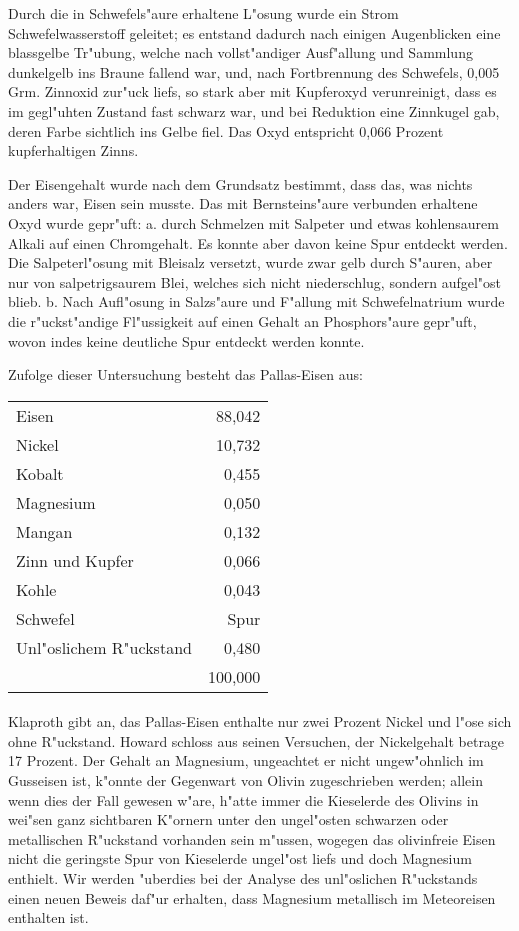 \documentclass[a4paper, 11pt, oneside]{article}
\begin{document}
Durch die in Schwefels"aure erhaltene L"osung wurde ein Strom Schwefelwasserstoff geleitet; es entstand dadurch nach einigen Augenblicken eine blassgelbe Tr"ubung, welche nach vollst"andiger Ausf"allung und Sammlung dunkelgelb ins Braune fallend war, und, nach Fortbrennung des Schwefels, 0,005 Grm. Zinnoxid zur"uck liefs, so stark aber mit Kupferoxyd verunreinigt, dass es im gegl"uhten Zustand fast schwarz war, und bei Reduktion eine Zinnkugel gab, deren Farbe sichtlich ins Gelbe fiel. Das Oxyd entspricht 0,066 Prozent kupferhaltigen Zinns.

Der Eisengehalt wurde nach dem Grundsatz bestimmt, dass das, was nichts anders war, Eisen sein musste. Das mit Bernsteins"aure verbunden erhaltene Oxyd wurde gepr"uft: a. durch Schmelzen mit Salpeter und etwas kohlensaurem Alkali auf einen Chromgehalt. Es konnte aber davon keine Spur entdeckt werden. Die Salpeterl"osung mit Bleisalz versetzt, wurde zwar gelb durch S"auren, aber nur von salpetrigsaurem Blei, welches sich nicht niederschlug, sondern aufgel"ost blieb. b. Nach Aufl"osung in Salzs"aure und F"allung mit Schwefelnatrium wurde die r"uckst"andige Fl"ussigkeit auf einen Gehalt an Phosphors"aure gepr"uft, wovon indes keine deutliche Spur entdeckt werden konnte.

Zufolge dieser Untersuchung besteht das Pallas-Eisen aus:
\begin{center}
\begin{tabular}{ l r }
    Eisen & 88,042\\
    Nickel & 10,732\\
    Kobalt & 0,455\\
    Magnesium & 0,050\\
    Mangan & 0,132\\
    Zinn und Kupfer & 0,066\\
    Kohle & 0,043\\
    Schwefel & Spur\\
    Unl"oslichem R"uckstand & 0,480\\
    & 100,000\\
\end{tabular}
\end{center}
\paragraph{}
Klaproth gibt an, das Pallas-Eisen enthalte nur zwei Prozent Nickel und l"ose sich ohne R"uckstand. Howard schloss aus seinen Versuchen, der Nickelgehalt betrage 17 Prozent. Der Gehalt an Magnesium, ungeachtet er nicht ungew"ohnlich im Gusseisen ist, k"onnte der Gegenwart von Olivin zugeschrieben werden; allein wenn dies der Fall gewesen w"are, h"atte immer die Kieselerde des Olivins in wei"sen ganz sichtbaren K"ornern unter den ungel"osten schwarzen oder metallischen R"uckstand vorhanden sein m"ussen, wogegen das olivinfreie Eisen nicht die geringste Spur von Kieselerde ungel"ost liefs und doch Magnesium enthielt. Wir werden "uberdies bei der Analyse des unl"oslichen R"uckstands einen neuen Beweis daf"ur erhalten, dass Magnesium metallisch im Meteoreisen enthalten ist.
\end{document}
